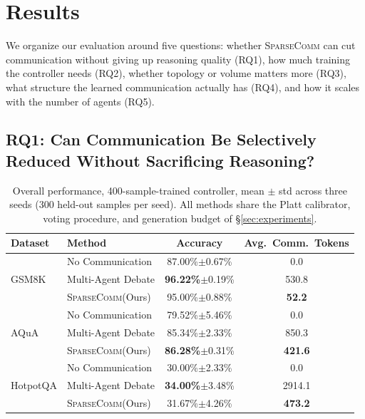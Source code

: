 \documentclass[11pt]{article}
\newcommand{\sys}{\textsc{SparseComm}\xspace}
\begin{document}
\section{Results}
\label{sec:results}

We organize our evaluation around five questions: whether \sys can cut
communication without giving up reasoning quality (RQ1), how much training
the controller needs (RQ2), whether topology or volume matters more (RQ3),
what structure the learned communication actually has (RQ4), and how it
scales with the number of agents (RQ5).

\subsection{RQ1: Can Communication Be Selectively Reduced Without Sacrificing Reasoning?}
\label{sec:rq1}

\begin{table}[t]
\centering
\small
\begin{tabular}{llcc}
\toprule
Dataset & Method & Accuracy & Avg.\ Comm.\ Tokens \\
\midrule
\multirow{3}{*}{GSM8K}
 & No Communication & 87.00\%$\pm$0.67\%          & 0.0 \\
 & Multi-Agent Debate & \textbf{96.22\%}$\pm$0.19\% & 530.8 \\
 & \sys (Ours)        & 95.00\%$\pm$0.88\%          & \textbf{52.2} \\
\midrule
\multirow{3}{*}{AQuA}
 & No Communication & 79.52\%$\pm$5.46\%          & 0.0 \\
 & Multi-Agent Debate & 85.34\%$\pm$2.33\%          & 850.3 \\
 & \sys (Ours)        & \textbf{86.28\%}$\pm$0.31\% & \textbf{421.6} \\
\midrule
\multirow{3}{*}{HotpotQA}
 & No Communication & 30.00\%$\pm$2.33\%          & 0.0 \\
 & Multi-Agent Debate & \textbf{34.00\%}$\pm$3.48\% & 2914.1 \\
 & \sys (Ours)        & 31.67\%$\pm$4.26\%          & \textbf{473.2} \\
\bottomrule
\end{tabular}
\caption{Overall performance, 400-sample-trained controller, mean $\pm$ std
across three seeds (300 held-out samples per seed). All methods share the
Platt calibrator, voting procedure, and generation budget of
\S\ref{sec:experiments}.}
\label{tab:main}
\end{table}
\end{document}
